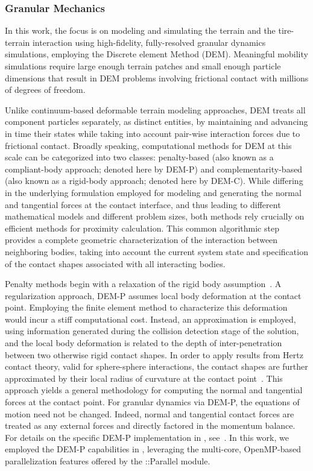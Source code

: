 \documentclass[12pt,twocolumn]{article}
\newcommand{\CHRONO}{{\sffamily{{Chrono}}}}
\newcommand{\ChronoParallel}{{\sffamily{Chrono}}::Parallel}
\begin{document}

\subsubsection{Granular Mechanics}\label{sss:GranMech}

In this work, the focus is on modeling and simulating the terrain and the tire-terrain interaction using high-fidelity, fully-resolved granular dynamics simulations, employing the Discrete element Method (DEM).  Meaningful mobility simulations require large enough terrain patches and small enough particle dimensions that result in DEM problems involving frictional contact with millions of degrees of freedom.

Unlike continuum-based deformable terrain modeling approaches, DEM treats all component particles separately, as distinct entities, by maintaining and advancing in time their states while taking into account pair-wise interaction forces due to frictional contact.
%
Broadly speaking, computational methods for DEM at this scale can be categorized into two classes: penalty-based (also known as a compliant-body approach; denoted here by DEM-P) and complementarity-based (also known as a rigid-body approach; denoted here by DEM-C).  While differing in the underlying formulation employed for modeling and generating the normal and tangential forces at the contact interface, and thus leading to different mathematical models and different problem sizes, both methods rely crucially on efficient methods for proximity calculation. This common algorithmic step provides a complete geometric characterization of the interaction between neighboring bodies, taking into account the current system state and specification of the contact shapes associated with all interacting bodies.

Penalty methods begin with a relaxation of the rigid body assumption~\cite{cundall71}. A regularization approach, DEM-P assumes local body deformation at the contact point. Employing the finite element method to characterize this deformation would incur a stiff computational cost. Instead, an approximation is employed, using information generated during the collision detection stage of the solution, and the local body deformation is related to the depth of inter-penetration between two otherwise rigid contact shapes. In order to apply results from Hertz contact theory, valid for sphere-sphere interactions, the contact shapes are further approximated by their local radius of curvature at the contact point~\cite{johnson1987contact}.
%
This approach yields a general methodology for computing the normal and tangential forces at the contact point.   For granular dynamics via DEM-P, the equations of motion need not be changed. Indeed, normal and tangential contact forces are treated as any external forces and directly factored in the momentum balance.
%
For details on the specific DEM-P implementation in {\CHRONO}, see~\cite{fleischmannetalJCND2015}.
%
In this work, we employed the DEM-P capabilities in {\CHRONO}, leveraging the multi-core, OpenMP-based parallelization features offered by the {\ChronoParallel} module.  
\end{document}
